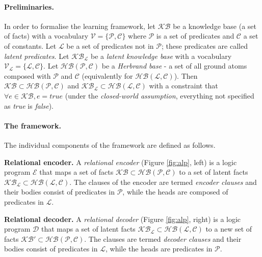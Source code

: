 \paragraph{Preliminaries.}
In order to formalise the learning framework, let $\mathcal{KB}$ be a knowledge base (a set of facts) with a vocabulary $\mathcal{V} = \{ \mathcal{P}, \mathcal{C}\}$ where $\mathcal{P}$ is a set of predicates and $\mathcal{C}$ a set of constants.
Let $\mathcal{L}$ be a set of predicates not in $\mathcal{P}$; these predicates are called \textit{latent predicates}.
Let $\mathcal{KB}_{\mathcal{L}}$ be a \textit{latent knowledge base} with a vocabulary $\mathcal{V}_{\mathcal{L}} = \{\mathcal{L}, \mathcal{C}\}$.
Let $\mathcal{HB(P,C)}$ be a \textit{Herbrand base} - a set of all ground atoms composed with $\mathcal{P}$ and $\mathcal{C}$ (equivalently for $\mathcal{HB(L,C)}$).
Then $\mathcal{KB} \subset \mathcal{HB(P,C)}$ and $\mathcal{KB}_{\mathcal{L}} \subset \mathcal{HB(L,C)}$ with a constraint that $\forall e \in \mathcal{KB}, e = true$ (under the \textit{closed-world assumption}, everything not specified as \textit{true} is \textit{false}).



\paragraph{The framework.}
The individual components of the framework are defined as follows.



\begin{definition}
\textbf{Relational encoder.}
A \textit{relational encoder} (Figure \ref{fig:alp}, left) is a logic program $\mathcal{E}$ %
that maps a set of facts $\mathcal{KB} \subset \mathcal{HB(P,C)}$ to a set of latent facts $\mathcal{KB}_{\mathcal{L}} \subset \mathcal{HB(L,C)}$.
The clauses of the encoder are termed \textit{encoder clauses} and their bodies consist of predicates in $\mathcal{P}$, while the heads are composed of predicates in $\mathcal{L}$.
\end{definition}


\begin{definition}
\textbf{Relational decoder.}
A \textit{relational decoder} (Figure \ref{fig:alp}, right) is a logic program $\mathcal{D}$ %
that maps a set of latent facts $\mathcal{KB}_{\mathcal{L}} \subset \mathcal{HB(L,C)}$  to a new set of facts $\mathcal{KB}' \subset \mathcal{HB(P,C)}$.
The clauses are termed \textit{decoder clauses} and their bodies consist of predicates in $\mathcal{L}$, while the heads are predicates in $\mathcal{P}$.
\end{definition}



